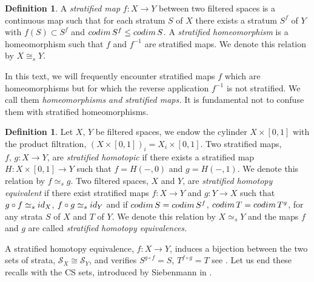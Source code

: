 \documentclass[a4paper,10pt,english,reqno]{amsart}
\theoremstyle{plain}
\theoremstyle{definition}
\newtheorem{definition}[proposition]{Definition}
\theoremstyle{remark}
\numberwithin{equation}{section}
\def\cS{{\mathcal S}}
\def\id{{\rm id}}
\def\codim{{\rm codim\,}}
\renewcommand\1{\hbox{\ding{192}}}
\renewcommand\2{\hbox{\ding{193}}}
\newcommand\3{\hbox{\ding{194}}}
\newcommand\4{\hbox{\ding{195}}}
\begin{document}
 

%
\begin{definition}\label{def:startifiedmap}
A \emph{stratified map} $f\colon X\to Y$ between two filtered spaces is a continuous map such that
for each stratum $S$ of $X$ there exists a stratum $S^f$ of $Y$ with $f(S)\subset S^f$
and $\codim S^f\leq \codim S$.
%
A \emph{stratified homeomorphism} is a homeomorphism such that $f$ and $f^{-1}$ are stratified maps.
We denote this relation by $X\cong_{s} Y$.
\end{definition}

In this text, we will frequently encounter  stratified maps $f$ which are homeomorphisms but for which the reverse application 
$f^{-1}$ is not stratified. We call them \emph{homeomorphisms and stratified maps.}  
It is fundamental not to confuse them with stratified homeomorphisms.

\begin{definition}\label{def:homotopyequistrat}
Let $X,\,Y$ be filtered spaces, we endow the cylinder $X\times [0,1]$ with the product filtration,
$(X\times [0,1])_{i}=X_{i}\times [0,1]$. 
% 
Two stratified maps, $f,\,g\colon X\to Y$, are \emph{stratified homotopic} if there exists a stratified map 
$H\colon X\times [0,1]\to Y$ such that
$f=H(-,0)$ and $g=H(-,1)$. We denote this relation by $f\simeq_{s} g$.
Two filtered spaces, $X$ and $Y$, are \emph{stratified homotopy equivalent} 
if there exist stratified maps 
$f\colon X\to Y$ and $g\colon Y\to X$ such that
$g\circ f \simeq_{s} \id_{X}$, $f\circ g \simeq_{s} \id_{Y}$ and 
if $\codim S=\codim S^f$, $\codim T=\codim T^g$,
for any strata $S$ of $X$ and $T$ of $Y$.
We denote this relation by $X \simeq_{s} Y$ and the maps $f$ and $g$ are called 
\emph{stratified homotopy equivalences.}
%
\end{definition}
A stratified homotopy equivalence, $f\colon X\to Y$, induces a bijection between the two sets of strata, 
$\cS_{X}\cong \cS_{Y}$, and verifies $S^{g\circ f}=S$, $T^{f\circ g}=T$
see \cite[Remark 2.9.11]{FriedmanBook}.
Let us end these recalls with the CS sets, introduced by  Siebenmann in \cite{MR0319207}.
%
 
\end{document}
